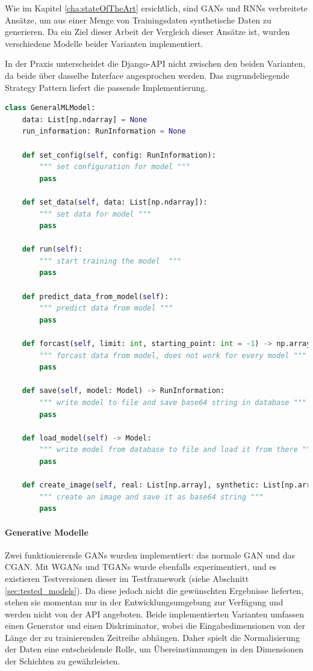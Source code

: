 Wie im Kapitel \ref{cha:stateOfTheArt} ersichtlich, sind \acp{GAN} und \acp{RNN} verbreitete Ansätze, um aus einer Menge von Trainingsdaten synthetische Daten zu generieren. Da ein Ziel dieser Arbeit der Vergleich dieser Ansätze ist, 
wurden verschiedene Modelle beider Varianten implementiert.

In der Praxis unterscheidet die Django-API nicht zwischen den beiden Varianten, da beide über dasselbe Interface angesprochen werden. Das zugrundeliegende Strategy Pattern liefert die passende Implementierung.


\begin{lstlisting}[language=Python, caption={Grundklasse zum Trainieren der Machine Learning Modelle, sie stellt Grundmethoden und geteilte Funktionalitäten bereit}, label={code:djangoAlgoGAN}]    
class GeneralMLModel:
    data: List[np.ndarray] = None
    run_information: RunInformation = None

    def set_config(self, config: RunInformation):
        """ set configuration for model """
        pass

    def set_data(self, data: List[np.ndarray]):
        """ set data for model """
        pass

    def run(self):
        """ start training the model  """
        pass

    def predict_data_from_model(self):
        """ predict data from model """
        pass

    def forcast(self, limit: int, starting_point: int = -1) -> np.array:
        """ forcast data from model, does not work for every model """
        pass

    def save(self, model: Model) -> RunInformation:
        """ write model to file and save base64 string in database """
        pass

    def load_model(self) -> Model:
        """ write model from database to file and load it from there """
        pass

    def create_image(self, real: List[np.array], synthetic: List[np.array], title: str):
        """ create an image and save it as base64 string """
        pass
\end{lstlisting}

\paragraph{Generative Modelle}
\label{sec:djangoGAN}
Zwei funktionierende \acp{GAN} wurden implementiert: das normale \ac{GAN} und das \ac{CGAN}. Mit \acp{WGAN} und \acp{TGAN} wurde ebenfalls experimentiert, und es existieren Testversionen dieser im Testframework (siehe Abschnitt \ref{sec:tested_models}). 
Da diese jedoch nicht die gewünschten Ergebnisse lieferten, stehen sie momentan nur in der Entwicklungsumgebung zur Verfügung und werden nicht von der API angeboten. Beide implementierten Varianten umfassen einen Generator und einen Diskriminator, 
wobei die Eingabedimensionen von der Länge der zu trainierenden Zeitreihe abhängen. Daher spielt die Normalisierung der Daten eine entscheidende Rolle, um Übereinstimmungen in den Dimensionen der Schichten zu gewährleisten.

